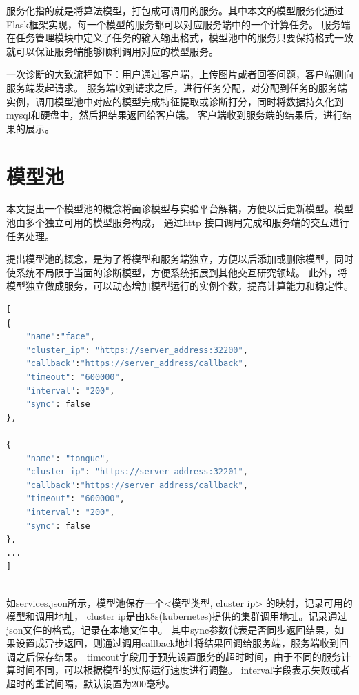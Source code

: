服务化指的就是将算法模型，打包成可调用的服务。其中本文的模型服务化通过Flask框架实现，每一个模型的服务都可以对应服务端中的一个计算任务。
服务端在任务管理模块中定义了任务的输入输出格式，模型池中的服务只要保持格式一致就可以保证服务端能够顺利调用对应的模型服务。

一次诊断的大致流程如下：用户通过客户端，上传图片或者回答问题，客户端则向服务端发起请求。
服务端收到请求之后，进行任务分配，对分配到任务的服务端实例，调用模型池中对应的模型完成特征提取或诊断打分，同时将数据持久化到mysql和硬盘中，然后把结果返回给客户端。
客户端收到服务端的结果后，进行结果的展示。

\section{模型池}
本文提出一个模型池的概念将面诊模型与实验平台解耦，方便以后更新模型。模型池由多个独立可用的模型服务构成， 通过http 接口调用完成和服务端的交互进行任务处理。

提出模型池的概念，是为了将模型和服务端独立，方便以后添加或删除模型，同时使系统不局限于当面的诊断模型，方便系统拓展到其他交互研究领域。
此外，将模型独立做成服务，可以动态增加模型运行的实例个数，提高计算能力和稳定性。



\begin{lstlisting}[language={Python}, title=services.json]
[
{
    "name":"face",
    "cluster_ip": "https://server_address:32200",
    "callback":"https://server_address/callback",
    "timeout": "600000",
    "interval": "200",
    "sync": false
}, 

{
    "name": "tongue",
    "cluster_ip": "https://server_address:32201",
    "callback":"https://server_address/callback",
    "timeout": "600000",
    "interval": "200",
    "sync": false
},
...
]
    
\end{lstlisting}

如services.json所示，模型池保存一个<模型类型, cluster ip> 的映射，记录可用的模型和调用地址， cluster ip是由k8s(kubernetes)提供的集群调用地址。记录通过json文件的格式，记录在本地文件中。
其中sync参数代表是否同步返回结果，如果设置成异步返回，则通过调用callback地址将结果回调给服务端，服务端收到回调之后保存结果。
timeout字段用于预先设置服务的超时时间，由于不同的服务计算时间不同，可以根据模型的实际运行速度进行调整。
interval字段表示失败或者超时的重试间隔，默认设置为200毫秒。

